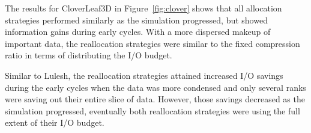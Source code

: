 The results for CloverLeaf3D in Figure~\ref{fig:clover} shows that all allocation strategies performed similarly as the simulation progressed, but showed information gains during early cycles. 
%
With a more dispersed makeup of important data, the reallocation strategies were similar to the fixed compression ratio in terms of distributing the I/O budget.


Similar to Lulesh, the reallocation strategies attained increased I/O savings during the early cycles when the data was more condensed and only several ranks were saving out their entire slice of data.
%
However, those savings decreased as the simulation progressed, eventually both reallocation strategies were using the full extent of their I/O budget. 





